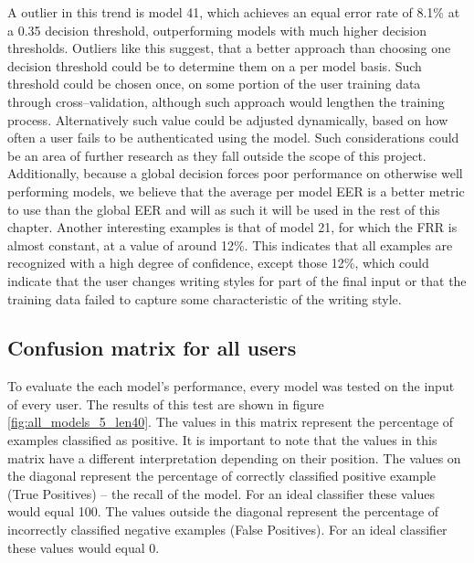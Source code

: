 A outlier in this trend is model 41, which achieves an equal error rate of 8.1\% at a 0.35 decision threshold, outperforming models with much higher decision thresholds. Outliers like this suggest, that a better approach than choosing one decision threshold could be to determine them on a per model basis. Such threshold could be chosen once, on some portion of the user training data through cross--validation, although such approach would lengthen the training process. Alternatively such value could be adjusted dynamically, based on how often a user fails to be authenticated using the model. Such considerations could be an area of further research as they fall outside the scope of this project.
Additionally, because a global decision forces poor performance on otherwise well performing models, we believe that the average per model EER is a better metric to use than the global EER and will as such it will be used in the rest of this chapter.
Another interesting examples is that of model 21, for which the FRR is almost constant, at a value of around 12\%. This indicates that all examples are recognized with a high degree of confidence, except those 12\%, which could indicate that the user changes writing styles for part of the final input or that the training data failed to capture some characteristic of the writing style.

\subsection{Confusion matrix for all users}
To evaluate the each model's performance, every model was tested on the input of every user. The results of this test are shown in figure \ref{fig:all_models_5_len40}. The values in this matrix represent the percentage of examples classified as positive. It is important to note that the values in this matrix have a different interpretation depending on their position. The values on the diagonal represent the percentage of correctly classified positive example (True Positives) -- the recall of the model. For an ideal classifier these values would equal 100. The values outside the diagonal represent the percentage of incorrectly classified negative examples (False Positives). For an ideal classifier these values would equal 0.

